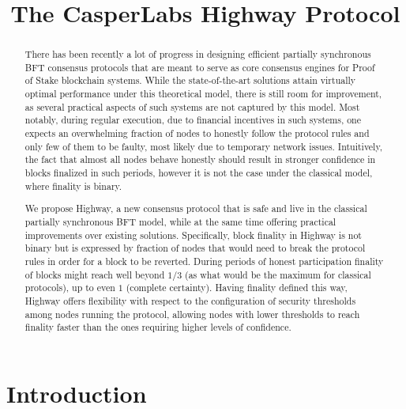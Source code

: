 \documentclass[12pt, fleqn]{article}
\title{The CasperLabs Highway Protocol}
\begin{document}
\maketitle

\begin{abstract}
There has been recently a lot of progress in designing efficient partially synchronous BFT consensus protocols that are meant to serve as core consensus engines for Proof of Stake blockchain systems.
% 
While the state-of-the-art solutions attain virtually optimal performance under this theoretical model, there is still room for improvement, as several practical aspects of such systems are not captured by this model.
%
Most notably, during regular execution, due to financial incentives in such systems, one expects an overwhelming fraction of nodes to honestly follow the protocol rules and only few of them to be faulty, most likely due to temporary network issues.
%
Intuitively, the fact that almost all nodes behave honestly should result in stronger confidence in blocks finalized in such periods, however it is not the case under the classical model, where finality is binary.
%

We propose Highway, a new consensus protocol that is safe and live in the classical partially synchronous BFT model, while at the same time offering practical improvements over existing solutions.
%
Specifically, block finality in Highway is not binary but is expressed by fraction of nodes that would need to break the protocol rules in order for a block to be reverted.
%
During periods of honest participation finality of blocks might reach well beyond $1/3$ (as what would be the maximum for classical protocols), up to even $1$ (complete certainty).
%
Having finality defined this way, Highway offers flexibility with respect to the configuration of security thresholds among nodes running the protocol, allowing nodes with lower thresholds to reach finality faster than the ones requiring higher levels of confidence.

\end{abstract}

\section{Introduction}
\end{document}
